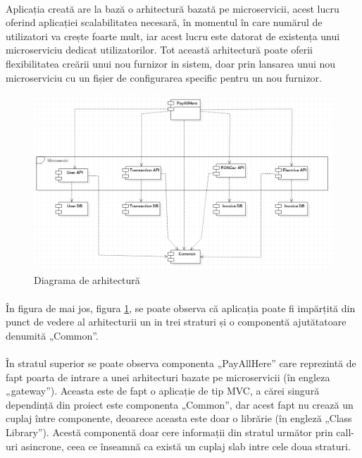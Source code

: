 \documentclass[12pt]{report}
\begin{document}
	\paragraph{}Aplicația creată are la bază o arhitectură bazată pe microservicii, acest lucru oferind aplicației scalabilitatea necesară, în momentul în care numărul de utilizatori va crește foarte mult, iar acest lucru este datorat de existența unui microserviciu dedicat utilizatorilor. Tot această arhitectură poate oferii flexibilitatea creării unui nou furnizor in sistem, doar prin lansarea unui nou microserviciu cu un fișier de configurarea specific pentru un nou furnizor.
	\begin{figure}[h]
  	\centering
  	\includegraphics[scale=0.8]{component}
	\caption{Diagrama de arhitectură}  
	\label{component}
  	\end{figure}
  	\paragraph{}În figura de mai jos, figura \ref{component}, se poate observa că aplicația poate fi impărțită din punct de vedere al arhitecturii un in trei straturi și o componentă ajutătatoare denumită „Common”.
	\paragraph{}În stratul superior se poate observa componenta „PayAllHere” care reprezintă de fapt poarta de intrare a unei arhitecturi bazate pe microservicii (în engleza „gateway”). Aceasta este de fapt o aplicație de tip MVC, a cărei singură dependință din proiect este componenta „Common”, dar acest fapt nu crează un cuplaj între componente, deoarece aceasta este doar o librărie (în engleză „Class Library”). Acestă componentă doar cere informații din stratul următor prin call-uri asincrone, ceea ce înseamnă ca există un cuplaj slab intre cele doua straturi.
\end{document}

